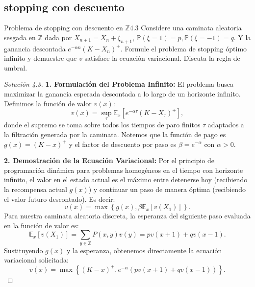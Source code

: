 \documentclass[10pt,a4paper]{article}
\begin{document}
\newpage
\subsection{stopping con descuento}

\begin{ejercicio}{Problema de stopping con descuento en $\mathbb{Z}$}{4.3}
    Considere una caminata aleatoria sesgada en $\mathbb{Z}$ dada por $X_{n+1} = X_n + \xi_{n+1}$, $\mathbb{P}(\xi=1)=p, \mathbb{P}(\xi=-1)=q$. Y la ganancia descontada $e^{-\alpha n}(K - X_n)^+$. Formule el problema de stopping óptimo infinito y demuestre que $v$ satisface la ecuación variacional. Discuta la regla de umbral.
\end{ejercicio}

\begin{proof}[Solución 4.3]
    \textbf{1. Formulación del Problema Infinito:}
    El problema busca maximizar la ganancia esperada descontada a lo largo de un horizonte infinito. Definimos la función de valor $v(x)$:
    \[ v(x) = \sup_{\tau} \mathbb{E}_x \left[ e^{-\alpha \tau} (K - X_\tau)^+ \right], \]
    donde el supremo se toma sobre todos los tiempos de paro finitos $\tau$ adaptados a la filtración generada por la caminata. Notemos que la función de pago es $g(x) = (K - x)^+$ y el factor de descuento por paso es $\beta = e^{-\alpha}$ con $\alpha > 0$.

    \textbf{2. Demostración de la Ecuación Variacional:}
    Por el principio de programación dinámica para problemas homogéneos en el tiempo con horizonte infinito, el valor en el estado actual es el máximo entre detenerse hoy (recibiendo la recompensa actual $g(x)$) y continuar un paso de manera óptima (recibiendo el valor futuro descontado).
    Es decir:
    \[ v(x) = \max \left\{ g(x), \beta \mathbb{E}_x[v(X_1)] \right\}. \]
    Para nuestra caminata aleatoria discreta, la esperanza del siguiente paso evaluada en la función de valor es:
    \[ \mathbb{E}_x[v(X_1)] = \sum_{y \in \mathbb{Z}} P(x, y) v(y) = p v(x+1) + q v(x-1). \]
    Sustituyendo $g(x)$ y la esperanza, obtenemos directamente la ecuación variacional solicitada:
    \[ v(x) = \max \left\{ (K - x)^+, e^{-\alpha} (p v(x+1) + q v(x-1)) \right\}. \]


\end{proof}
\end{document}
